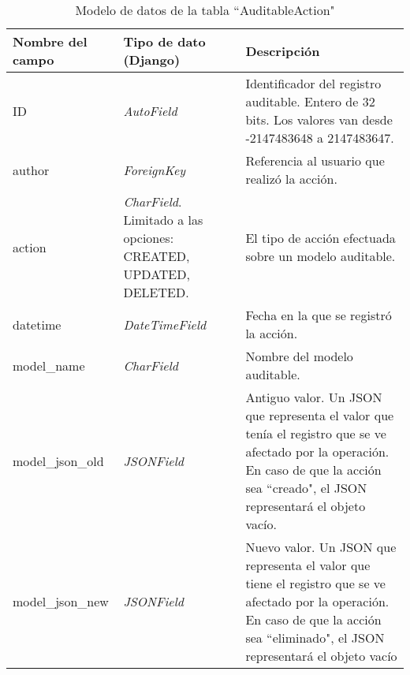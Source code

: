 \begin{table}[h]
\centering
\caption{Modelo de datos de la tabla “AuditableAction"}
\label{tabla:1.3}
\begin{tabular}{| p{} | p{} | p{} |}
\hline
\textbf{Nombre del campo} & \textbf{Tipo de dato (Django)}                              & \textbf{Descripción}                                                                                                                                                                   \\ \hline
ID                        & \textit{AutoField}                                 & Identificador del registro auditable. Entero de 32 bits. Los valores van desde -2147483648 a 2147483647.                      \\ \hline
author                    & \textit{ForeignKey}                                         & Referencia al usuario que realizó la acción.                                                                                                                                           \\ \hline
action                    & \textit{CharField}. Limitado a las opciones: CREATED,
UPDATED, DELETED. & El tipo de acción efectuada sobre un modelo auditable.                                                                                                                                 \\ \hline
datetime            & \textit{DateTimeField} & Fecha en la que se registró la acción.\\ \hline
model\_name               & \textit{CharField}                                 & Nombre del modelo auditable.  \\ \hline
model\_json\_old          & \textit{JSONField}                                 & Antiguo valor. Un JSON que representa el valor que tenía el registro que se ve afectado por la operación. En caso de que la acción sea “creado", el JSON representará el objeto vacío. \\ \hline
model\_json\_new          & \textit{JSONField}                                 & Nuevo valor. Un JSON que representa el valor que tiene el registro que se ve afectado por la operación. En caso de que la acción sea “eliminado", el JSON representará el objeto vacío \\ \hline
\end{tabular}

\end{table}

